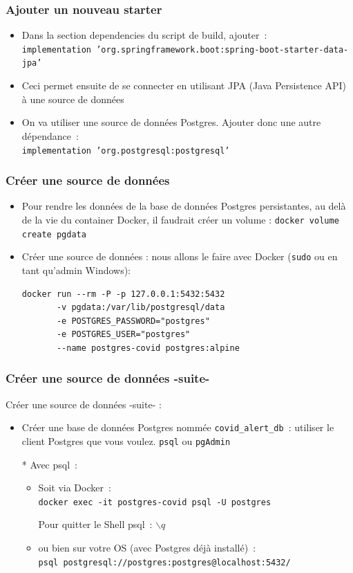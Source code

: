 \documentclass{beamer}
\begin{document}
\begin{frame}[fragile]
	\frametitle{Ajouter un nouveau starter}
	\begin{itemize}
		\item Dans la section dependencies du script de build, ajouter~:\\
		\texttt{implementation 'org.springframework.boot:spring-boot-starter-data-jpa'}
		\item Ceci permet ensuite de se connecter en utilisant JPA (Java Persistence API) à une source de données
		\item On va utiliser une source de données Postgres. Ajouter donc une autre dépendance~:\\
		\texttt{implementation 'org.postgresql:postgresql'}
		
\end{itemize}
\end{frame}

\begin{frame}[fragile]
	\frametitle{Créer une source de données}
	\begin{itemize}
		\item Pour rendre les données de la base de données Postgres persistantes, au delà de la vie du container Docker, il faudrait créer un volume :
		\texttt{docker volume create pgdata}
		
		\item Créer une source de données : nous allons le faire avec Docker (\texttt{sudo} ou en tant qu'admin Windows):
\begin{verbatim}
docker run --rm -P -p 127.0.0.1:5432:5432
       -v pgdata:/var/lib/postgresql/data
       -e POSTGRES_PASSWORD="postgres" 
       -e POSTGRES_USER="postgres" 
       --name postgres-covid postgres:alpine
\end{verbatim}
\end{itemize}
\end{frame}

\begin{frame}[fragile]
	\frametitle{Créer une source de données -suite-}
	Créer une source de données -suite- : 
		\begin{itemize}		
			\item Créer une base de données Postgres nommée \texttt{covid\_alert\_db}~: utiliser le client Postgres que vous voulez. \texttt{psql} ou \texttt{pgAdmin}
			\item[*] Avec psql~:
			\begin{itemize}
				\item Soit via Docker~:\\
				\footnotesize \texttt{docker exec -it postgres-covid psql -U postgres}
				\normalsize
				\item[] Pour quitter le Shell psql~: $\backslash$$q$
				\item ou bien sur votre OS (avec Postgres déjà installé)~:\\
				\footnotesize
			\texttt{psql postgresql://postgres:postgres@localhost:5432/}
			\normalsize	
			\end{itemize}
	\end{itemize}
\end{frame}
\end{document}
